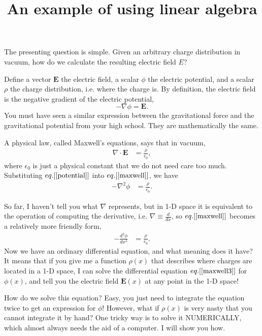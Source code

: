 \documentclass[paper=a4,fontsize=11pt]{scrartcl} %
\title{An example of using linear algebra}
\begin{document}
\maketitle

The presenting question is simple. Given an arbitrary charge distribution in vacuum, how do we calculate the resulting electric field $E$?

Define a vector $\mathbf{E}$ the electric field, a scalar $\phi$ the electric potential, and a scalar $\rho$ the charge distribution, i.e. where the charge is. By definition, the electric field is the negative gradient of the electric potential,
\begin{equation}\label{potential}
-\nabla \phi = \mathbf{E}.
\end{equation}
You must have seen a similar expression between the gravitational force and the gravitational potential from your high school. They are mathematically the same. 

A physical law, called Maxwell's equations, says that in vacuum,
\begin{align} \label{maxwell}
    \nabla\cdot\mathbf{E} &= \frac{\rho}{\epsilon_0},
\end{align}
where $\epsilon_0$ is just a physical constant that we do not need care too much. Substituting $eq.[\ref{potential}]$ into $eq.[\ref{maxwell}]$, we have
\begin{align}\label{maxwell2}
    -\nabla^2 \phi &= \frac{\rho}{\epsilon_0}.
\end{align}

So far, I haven't tell you what $\nabla$ represents, but in 1-D space it is equivalent to the operation of computing the derivative, i.e. $\nabla\equiv\frac{d}{dx}$, so $eq.[\ref{maxwell}]$ becomes a relatively more friendly form,
\begin{align} \label{maxwell3}
-\frac{d^2\phi}{dx^2} &= \frac{\rho}{\epsilon_0}.
\end{align}
Now we have an ordinary differential equation, and what meaning does it have? It means that if you give me a function $\rho(x)$ that describes where charges are located in a 1-D space, I can solve the differential equation $eq.[\ref{maxwell3}]$ for $\phi(x)$, and tell you the electric field $\mathbf{E}(x)$ at any point in the 1-D space!

How do we solve this equation? Easy, you just need to integrate the equation twice to get an expression for $\phi$! However, what if $\rho(x)$ is very nasty that you cannot integrate it by hand? One tricky way is to solve it NUMERICALLY, which almost always needs the aid of a computer. I will show you how.
\end{document}
